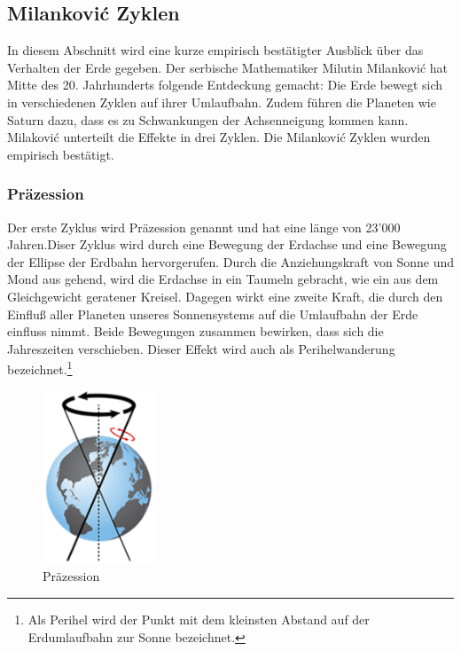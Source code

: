 \begin{refsection}
\subsection{Milankovi\'c Zyklen}\label{sec:mil} 
In diesem Abschnitt wird eine kurze empirisch bestätigter Ausblick über das Verhalten der Erde gegeben. Der serbische Mathematiker Milutin Milankovi\'c hat Mitte des 20. Jahrhunderts folgende Entdeckung gemacht: Die Erde bewegt sich in verschiedenen Zyklen auf ihrer Umlaufbahn. Zudem führen die Planeten wie Saturn dazu, dass es zu Schwankungen der Achsenneigung kommen kann. Milakovi\'c unterteilt die Effekte in drei Zyklen. Die Milankovi\'c Zyklen wurden empirisch bestätigt.

\subsubsection{Präzession}
Der erste Zyklus wird Präzession genannt und hat eine länge von 23'000 Jahren.Diser Zyklus wird durch eine Bewegung der Erdachse und eine Bewegung der Ellipse der Erdbahn hervorgerufen. Durch die Anziehungskraft von Sonne und Mond aus gehend, wird die Erdachse in ein Taumeln gebracht, wie ein aus dem Gleichgewicht geratener Kreisel. Dagegen wirkt eine zweite Kraft, die durch den Einfluß aller Planeten unseres Sonnensystems auf die Umlaufbahn der Erde einfluss nimmt. Beide Bewegungen zusammen bewirken, dass sich die Jahreszeiten verschieben. Dieser Effekt wird auch als Perihelwanderung bezeichnet.\footnote{Als Perihel wird der Punkt mit dem kleinsten Abstand auf der Erdumlaufbahn zur Sonne bezeichnet.}
%
\begin{figure}
	\centering
	\includegraphics[width= 0.3\textwidth]{neigung/Precession.png}
	\caption[Präzession]{Präzession}
	\label{fig:abb}
\end{figure}


\end{refsection}
